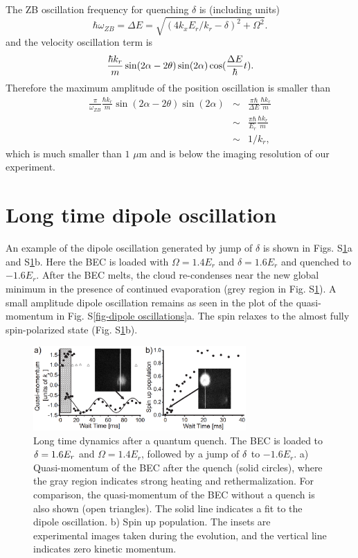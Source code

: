 \documentclass[prl,aps,twocolumn,showpacs,floatfix]{revtex4-1}
\begin{document}
\begin{appendix}
\begin{widetext}
The ZB oscillation frequency for quenching $\delta $ is (including
units)
\begin{equation}
\hbar \omega _{ZB}=\Delta E=\sqrt{(4k_{x}E_{r}/k_{r}-\delta )^{2}+\Omega ^{2}%
}.
\end{equation}%
and the velocity oscillation term is
\begin{equation*}
\frac{\hbar k_{r}}{m}\sin (2\alpha -2\theta )\sin (2\alpha )\cos (\frac{%
\Delta E}{\hbar }t).
\end{equation*}%
Therefore the maximum amplitude of the position oscillation is
smaller than
\begin{eqnarray}
\frac{\pi }{\omega _{ZB}}\frac{\hbar k_{r}}{m}\sin (2\alpha -2\theta )\sin
(2\alpha ) &\sim &\frac{\pi \hbar }{\Delta E}\frac{\hbar k_{r}}{m} \\
&\sim &\frac{\pi \hbar }{E_{r}}\frac{\hbar k_{r}}{m} \\
&\sim &1/k_{r},
\end{eqnarray}%
which is much smaller than $1$ $\mu $m and is below the imaging
resolution of our experiment.

\section{Long time dipole oscillation}

An example of the dipole oscillation generated by jump of $\delta $ is shown
in Figs. S\ref{fig-dipole oscillations}a and S\ref{fig-dipole oscillations}b.
Here the BEC is loaded with $\Omega =1.4E_{r}$ and $\delta =1.6E_{r}$ and
quenched to $-1.6E_{r}$. After the BEC melts, the cloud re-condenses near
the new global minimum in the presence of continued evaporation (grey region
in Fig. S\ref{fig-dipole oscillations}). A small amplitude dipole oscillation
remains as seen in the plot of the quasi-momentum in Fig. S\ref{fig-dipole
oscillations}a. The spin relaxes to the almost fully spin-polarized state
(Fig. S\ref{fig-dipole oscillations}b).

\begin{figure}[tbp]
\centering
\includegraphics[width=3.2in]{Fig1QuPRLsup.eps}
\caption{Long time dynamics after a quantum quench. The BEC is loaded to $%
\protect\delta =1.6E_{r}$ and $\Omega =1.4E_{r}$, followed by a jump of $%
\protect\delta $ to $-1.6E_{r}$. a) Quasi-momentum of the BEC after
the quench (solid circles), where the gray region indicates strong
heating and rethermalization. For comparison, the quasi-momentum of
the BEC without a quench is also shown (open triangles). The solid
line indicates a fit to the dipole oscillation. b) Spin up
population. The insets are experimental images taken during the
evolution, and the vertical line indicates zero kinetic momentum. }
\label{fig-dipole oscillations}
\end{figure}


\end{widetext}
\end{appendix}
\end{document}
